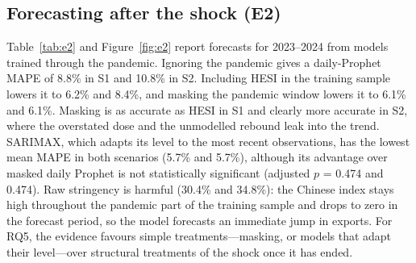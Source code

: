 \documentclass{article}
\theoremstyle{plain}
\theoremstyle{definition}
\theoremstyle{remark}
\begin{document}
\subsection{Forecasting after the shock (E2)}
Table~\ref{tab:e2} and Figure~\ref{fig:e2} report forecasts for 2023--2024 from models trained through the pandemic. Ignoring the pandemic gives a daily-Prophet MAPE of 8.8\% in S1 and 10.8\% in S2. Including HESI in the training sample lowers it to 6.2\% and 8.4\%, and masking the pandemic window lowers it to 6.1\% and 6.1\%. Masking is as accurate as HESI in S1 and clearly more accurate in S2, where the overstated dose and the unmodelled rebound leak into the trend. SARIMAX, which adapts its level to the most recent observations, has the lowest mean MAPE in both scenarios (5.7\% and 5.7\%), although its advantage over masked daily Prophet is not statistically significant (adjusted $p$ = 0.474 and 0.474). Raw stringency is harmful (30.4\% and 34.8\%): the Chinese index stays high throughout the pandemic part of the training sample and drops to zero in the forecast period, so the model forecasts an immediate jump in exports. For RQ5, the evidence favours simple treatments---masking, or models that adapt their level---over structural treatments of the shock once it has ended.
\end{document}
